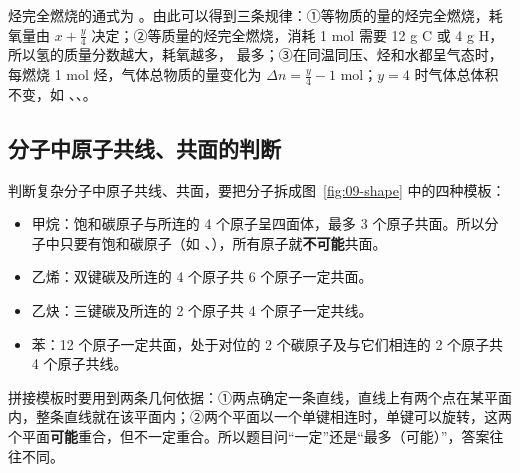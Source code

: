 \documentclass[UTF8,a4paper,zihao=5,oneside,openany,fontset=none]{ctexbook}
\begin{document}
烃完全燃烧的通式为 。由此可以得到三条规律：①等物质的量的烃完全燃烧，耗氧量由 $x+\frac y4$ 决定；②等质量的烃完全燃烧，消耗 1 mol  需要 12 g C 或 4 g H，所以氢的质量分数越大，耗氧越多， 最多；③在同温同压、烃和水都呈气态时，每燃烧 1 mol 烃，气体总物质的量变化为 $\Delta n=\frac y4-1$ mol；$y=4$ 时气体总体积不变，如 、、。

\subsection{分子中原子共线、共面的判断}
判断复杂分子中原子共线、共面，要把分子拆成图~\ref{fig:09-shape} 中的四种模板：
\begin{itemize}
\item 甲烷：饱和碳原子与所连的 4 个原子呈四面体，最多 3 个原子共面。所以分子中只要有饱和碳原子（如 、），所有原子就\textbf{不可能}共面。
\item 乙烯：双键碳及所连的 4 个原子共 6 个原子一定共面。
\item 乙炔：三键碳及所连的 2 个原子共 4 个原子一定共线。
\item 苯：12 个原子一定共面，处于对位的 2 个碳原子及与它们相连的 2 个原子共 4 个原子共线。
\end{itemize}
拼接模板时要用到两条几何依据：①两点确定一条直线，直线上有两个点在某平面内，整条直线就在该平面内；②两个平面以一个单键相连时，单键可以旋转，这两个平面\textbf{可能}重合，但不一定重合。所以题目问“一定”还是“最多（可能）”，答案往往不同。
\end{document}
